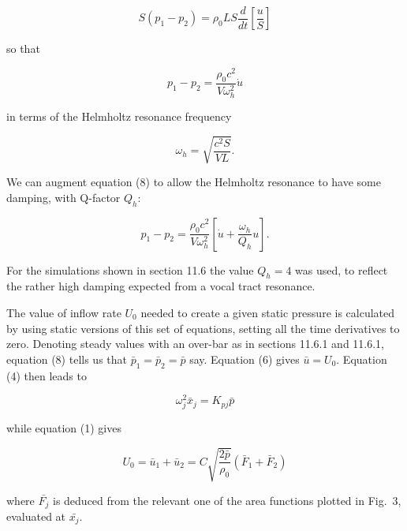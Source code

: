   $$S(p_1-p_2) = \rho_0 L S \dfrac{d}{dt}\left[\dfrac{u}{S}\right] \tag{7}$$ 

  so that 

  $$p_1-p_2=\dfrac{\rho_0 c^2}{V \omega_h^2} \dot{u} \tag{8}$$ 

  in terms of the Helmholtz resonance frequency 

  $$\omega_h=\sqrt{\dfrac{c^2 S}{VL}}. \tag{9}$$ 

  We can augment equation (8) to allow the Helmholtz resonance to have some 
  damping, with Q-factor $Q_h$: 

  $$p_1-p_2=\dfrac{\rho_0 c^2}{V \omega_h^2} \left[\dot{u}+ 
  \dfrac{\omega_h}{Q_h}u \right] . \tag{10}$$ 

  For the simulations shown in section 11.6 the value $Q_h=4$ was used, to 
  reflect the rather high damping expected from a vocal tract resonance. 

  The value of inflow rate $U_0$ needed to create a given static pressure is 
  calculated by using static versions of this set of equations, setting all the 
  time derivatives to zero. Denoting steady values with an over-bar as in 
  sections 11.6.1 and 11.6.1, equation (8) tells us that 
  $\bar{p}_1=\bar{p}_2=\bar{p}$ say. Equation (6) gives $\bar{u}=U_0$. Equation 
  (4) then leads to 

  $$\omega_j^2 \bar{x}_j=K_{pj} \bar{p} \tag{11}$$ 

  while equation (1) gives 

  $$U_0=\bar{u}_1+\bar{u}_2= C \sqrt{\dfrac{2 \bar{p}}{\rho_0}} 
  (\bar{F}_1+\bar{F}_2) \tag{12}$$ 

  where $\bar{F_j}$ is deduced from the relevant one of the area functions 
  plotted in Fig.\ 3, evaluated at $\bar{x_j}$. 